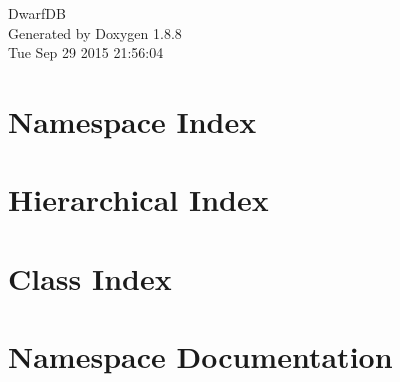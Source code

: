 \documentclass[twoside]{book}
\newcommand{\+}{\discretionary{\mbox{\scriptsize$\hookleftarrow$}}{}{}}
\newcommand{\clearemptydoublepage}{%
  \newpage{\pagestyle{empty}\cleardoublepage}%
}
\begin{document}
\hypersetup{pageanchor=false,
             bookmarks=true,
             bookmarksnumbered=true,
             pdfencoding=unicode
            }
\begin{titlepage}
\vspace*{7cm}
\begin{center}%
{\Large Dwarf\+D\+B }\\
\vspace*{1cm}
{\large Generated by Doxygen 1.8.8}\\
\vspace*{0.5cm}
{\small Tue Sep 29 2015 21:56:04}\\
\end{center}
\end{titlepage}
\clearemptydoublepage
\tableofcontents
\clearemptydoublepage
{}
\hypersetup{pageanchor=true}

\chapter{Namespace Index}

\chapter{Hierarchical Index}

\chapter{Class Index}

\chapter{Namespace Documentation}















\end{document}
